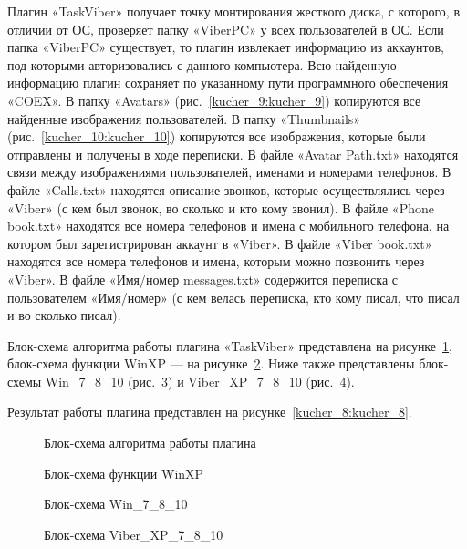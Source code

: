 Плагин «TaskViber» получает точку монтирования жесткого диска, с которого, в отличии от ОС, проверяет папку «ViberPC» у всех пользователей в ОС. Если папка «ViberPC» существует, то плагин извлекает информацию из аккаунтов, под которыми авторизовались с данного компьютера. Всю найденную информацию плагин сохраняет по указанному пути программного обеспечения «COEX». В папку «Avatars» (рис.~\ref{kucher_9:kucher_9}) копируются все найденные изображения пользователей. В папку «Thumbnails» (рис.~\ref{kucher_10:kucher_10}) копируются все изображения, которые были отправлены и получены в ходе переписки. В файле «Avatar Path.txt» находятся связи между изображениями пользователей, именами и номерами телефонов. В файле «Calls.txt» находятся описание звонков, которые осуществлялись через «Viber» (с кем был звонок, во сколько и кто кому звонил). В файле «Phone book.txt» находятся все номера телефонов и имена с мобильного телефона, на котором был зарегистрирован аккаунт в «Viber». В файле «Viber book.txt» находятся все номера телефонов и имена, которым можно позвонить через «Viber». В файле «Имя/номер messages.txt» содержится переписка с пользователем «Имя/номер» (с кем велась переписка, кто кому писал, что писал и во сколько писал).

Блок-схема алгоритма работы плагина «TaskViber» представлена на рисунке~\ref{kucher_4:kucher_4}, блок-схема функции WinXP --- на рисунке~\ref{kucher_5:kucher_5}. Ниже также представлены блок-схемы Win\_7\_8\_10 (рис.~\ref{kucher_6:kucher_6}) и Viber\_XP\_7\_8\_10 (рис.~\ref{kucher_7:kucher_7}).

Результат работы плагина представлен на рисунке~\ref{kucher_8:kucher_8}.
 

\begin{figure}[h!]
\caption{ Блок-схема алгоритма работы плагина }
\label{kucher_4:kucher_4}
\end{figure} 
  
\begin{figure}[h!]
\caption{ Блок-схема функции WinXP }
\label{kucher_5:kucher_5}
\end{figure} 

\begin{figure}[ht]
\caption{ Блок-схема Win\_7\_8\_10 }
\label{kucher_6:kucher_6}
\end{figure} 

\begin{figure}[h!]
\caption{ Блок-схема Viber\_XP\_7\_8\_10 }
\label{kucher_7:kucher_7}
\end{figure} 

